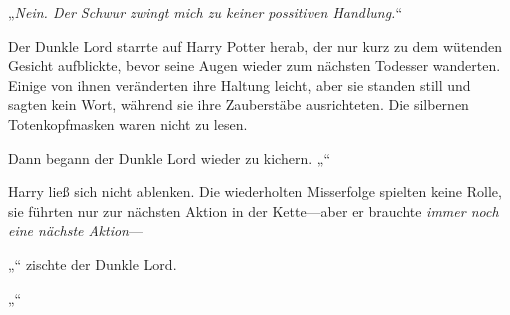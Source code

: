 „\emph{Nein. Der Schwur zwingt mich zu keiner possitiven Handlung.}“

Der Dunkle Lord starrte auf Harry Potter herab, der nur kurz zu dem wütenden Gesicht aufblickte, bevor seine Augen wieder zum nächsten Todesser wanderten.
Einige von ihnen veränderten ihre Haltung leicht, aber sie standen still und sagten kein Wort, während sie ihre Zauberstäbe ausrichteten. Die silbernen Totenkopfmasken waren nicht zu lesen.

Dann begann der Dunkle Lord wieder zu kichern.
„“

Harry ließ sich nicht ablenken. Die wiederholten Misserfolge spielten keine Rolle, sie führten nur zur nächsten Aktion in der Kette—aber er brauchte \emph{immer noch eine nächste Aktion}—

„“ zischte der Dunkle Lord.

„“

